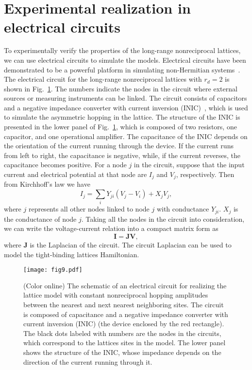 \documentclass[prb,aps,twocolumn,showpacs]{revtex4-2} %
\begin{document}
\section{Experimental realization in electrical circuits}\label{sect6}
To experimentally verify the properties of the long-range nonreciprocal lattices, we can use electrical circuits to simulate the models. Electrical circuits have been demonstrated to be a powerful platform in simulating non-Hermitian systems~\cite{Imhof2018NatPhys,Hofmann2019PRL,Helbig2019arxiv}. The electrical circuit for the long-range nonreciprocal lattices with $r_d=2$ is shown in Fig.~\ref{fig9}. The numbers indicate the nodes in the circuit where
external sources or measuring instruments can be linked. The circuit consists of capacitors and a negative impedance converter with current inversion (INIC)~\cite{Hofmann2019PRL,Chen2009}, which is used to simulate the asymmetric hopping in the lattice. The structure of the INIC is presented in the lower panel of Fig.~\ref{fig9}, which is composed of two resistors, one capacitor, and one operational amplifier. The capacitance of the INIC depends on the orientation of the current running through the device. If the current runs from left to right, the capacitance is negative, while, if the current reverses, the capacitance becomes positive. For a node $j$ in the circuit, suppose that the input current and electrical potential at that node are $I_j$ and $V_j$, respectively. Then from Kirchhoff's law we have
\begin{equation}
	I_j = \sum_i Y_{ji} (V_j - V_i) + X_j V_j,
\end{equation}
where $j$ represents all other nodes linked to node $j$ with conductance $Y_{ji}$. $X_j$ is the conductance of node $j$. Taking all the nodes in the circuit into consideration, we can write the voltage-current relation into a compact matrix form as 
\begin{equation}
	\boldsymbol{I} = \boldsymbol{JV},
\end{equation}
where $\boldsymbol{J}$ is the Laplacian of the circuit. The circuit Laplacian can be used to model the tight-binding lattices Hamiltonian. 

\begin{figure}[t]
	\texttt{[image: fig9.pdf]}
	\caption{(Color online) The schematic of an electrical circuit for realizing the lattice model with constant nonreciprocal hopping amplitudes between the nearest and next nearest neighboring sites. The circuit is composed of capacitance and a negative impedance converter with current inversion (INIC) (the device enclosed by the red rectangle). The black dots labeled with numbers are the nodes in the circuits, which correspond to the lattices sites in the model. The lower panel shows the structure of the INIC, whose impedance depends on the direction of the current running through it.}
	\label{fig9}
\end{figure}
\end{document}
